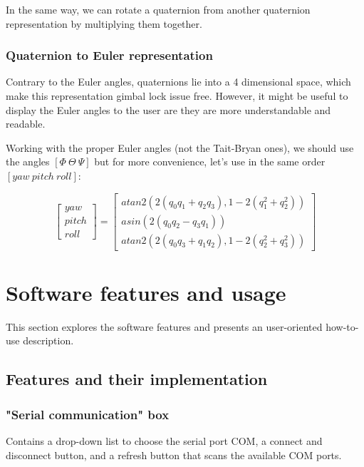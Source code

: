 \documentclass{article}
\begin{document}
\vspace{\baselineskip}

In the same way, we can rotate a quaternion from another quaternion representation by multiplying them together.


\subsubsection{Quaternion to Euler representation}

Contrary to the Euler angles, quaternions lie into a 4 dimensional space, which make this representation gimbal lock issue free. However, it might be useful to display the Euler angles to the user are they are more understandable and readable. 

\vspace{\baselineskip}

Working with the proper Euler angles (not the Tait-Bryan ones), we should use the angles $[\Phi\ \Theta\ \Psi]$ but for more convenience, let's use in the same order
$[yaw\ pitch\ roll]$:


$$
\begin{bmatrix}
yaw \\
pitch \\
roll
\end{bmatrix} 
=
\begin{bmatrix}
atan2(2(q_0 q_1 + q_2 q_3),1 - 2(q_1^2 + q_2^2)) \\
asin(2(q_0 q_2 - q_3 q_1)) \\
atan2(2(q_0 q_3 + q_1 q_2),1 - 2(q_2^2 + q_3^2))
\end{bmatrix} 
$$

\section{Software features and usage}

This section explores the software features and presents an user-oriented how-to-use description.

\subsection{Features and their implementation}

\subsubsection{"Serial communication" box}

Contains a drop-down list to choose the serial port COM, a connect and disconnect button, and a refresh button that scans the available COM ports.
\end{document}
